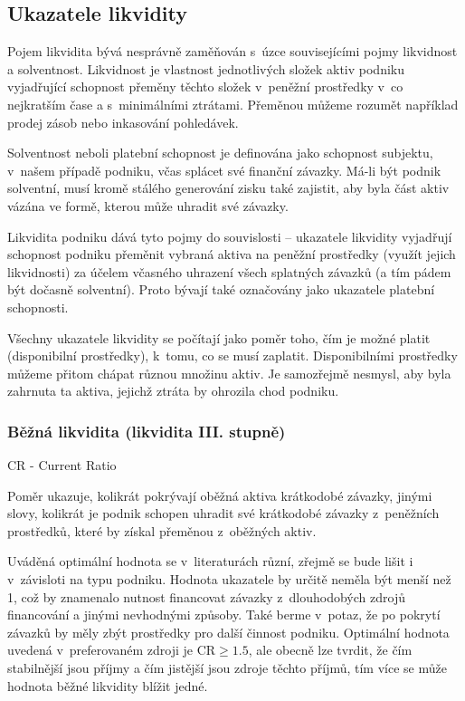 \subsection{Ukazatele likvidity}
Pojem likvidita bývá nesprávně zaměňován s~úzce souvisejícími pojmy likvidnost a solventnost. Likvidnost je vlastnost jednotlivých složek aktiv podniku vyjadřující schopnost přeměny těchto složek v~peněžní prostředky v~co nejkratším čase a s~minimálními ztrátami\cite{nyvlt}. Přeměnou můžeme rozumět například prodej zásob nebo inkasování pohledávek. 

Solventnost neboli platební schopnost je definována jako schopnost subjektu, v~našem případě podniku, včas splácet své finanční závazky. Má-li být podnik solventní, musí kromě stálého generování zisku také zajistit, aby byla část aktiv vázána ve formě, kterou může uhradit své závazky.

Likvidita podniku dává tyto pojmy do souvislosti -- ukazatele likvidity vyjadřují schopnost podniku přeměnit vybraná aktiva na peněžní prostředky (využít jejich likvidnosti) za účelem včasného uhrazení všech splatných závazků (a tím pádem být dočasně solventní)\cite{schol}. Proto bývají také označovány jako ukazatele platební schopnosti.

Všechny ukazatele likvidity se počítají jako poměr toho, čím je možné platit (disponibilní prostředky), k~tomu, co se musí zaplatit. Disponibilními prostředky můžeme přitom chápat různou množinu aktiv. Je samozřejmě nesmysl, aby byla zahrnuta ta aktiva, jejichž ztráta by ohrozila chod podniku.

\subsubsection{Běžná likvidita (likvidita III. stupně)} 
CR - Current Ratio

Poměr ukazuje, kolikrát pokrývají oběžná aktiva krátkodobé závazky, jinými slovy, kolikrát je podnik schopen uhradit své krátkodobé závazky z~peněžních prostředků, které by získal přeměnou z~oběžných aktiv.

Uváděná optimální hodnota se v~literaturách různí, zřejmě se bude lišit i v~závisloti na typu podniku. Hodnota ukazatele by určitě neměla být menší než 1, což by znamenalo nutnost financovat závazky z~dlouhodobých zdrojů financování a jinými nevhodnými způsoby. Také berme v~potaz, že po pokrytí závazků by měly zbýt prostředky pro další činnost podniku.
Optimální hodnota uvedená v~preferovaném zdroji je CR$\geq 1.5$, ale obecně lze tvrdit, že čím stabilnější jsou příjmy a čím jistější jsou zdroje těchto příjmů, tím více se může hodnota běžné likvidity blížit jedné\cite{businessvize_bez_likv}.

